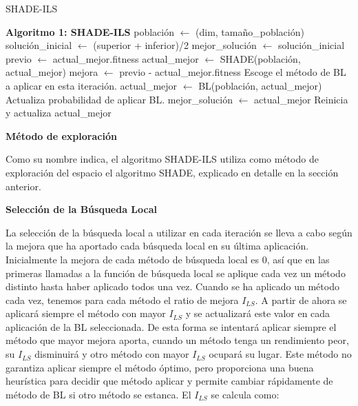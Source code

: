\begin{algorithm}
\caption{SHADE-ILS}
\begin{algorithmic}[1]
\STATE \textbf{Algoritmo 1: SHADE-ILS}
\STATE población $\leftarrow$ (dim, tamaño\_población)
\STATE solución\_inicial $\leftarrow$ (superior + inferior)/2
\STATE mejor\_solución $\leftarrow$ solución\_inicial
    \STATE previo $\leftarrow$ actual\_mejor.fitness
    \STATE actual\_mejor $\leftarrow$ SHADE(población, actual\_mejor)
    \STATE mejora $\leftarrow$ previo - actual\_mejor.fitness
    \STATE Escoge el método de BL a aplicar en esta iteración.
    \STATE actual\_mejor $\leftarrow$ BL(población, actual\_mejor)
    \STATE Actualiza probabilidad de aplicar BL.
        \STATE mejor\_solución $\leftarrow$ actual\_mejor
    \ENDIF
        \STATE Reinicia y actualiza actual\_mejor
    \ENDIF
\ENDWHILE
\end{algorithmic}
\end{algorithm}

\vspace{10px}

\noindent\textbf{Método de exploración}

Como su nombre indica, el algoritmo SHADE-ILS utiliza como método de exploración del espacio el algoritmo SHADE, explicado en detalle en la sección anterior.

\vspace{10px}

\noindent\textbf{Selección de la Búsqueda Local}

La selección de la búsqueda local a utilizar en cada iteración se lleva a cabo según la mejora que ha aportado cada búsqueda local en su última aplicación. Inicialmente la mejora de cada método de búsqueda local es $0$, así que en las primeras llamadas a la función de búsqueda local se aplique cada vez un método distinto hasta haber aplicado todos una vez. Cuando se ha aplicado un método cada vez, tenemos para cada método el ratio de mejora \( I_{LS} \). A partir de ahora se aplicará siempre el método con mayor \( I_{LS} \) y se actualizará este valor en cada aplicación de la BL seleccionada. De esta forma se intentará aplicar siempre el método que mayor mejora aporta, cuando un método tenga un rendimiento peor, su \( I_{LS} \) disminuirá y otro método con mayor \( I_{LS} \) ocupará su lugar. Este método no garantiza aplicar siempre el método óptimo, pero proporciona una buena heurística para decidir que método aplicar y permite cambiar rápidamente de método de BL si otro método se estanca. El \( I_{LS} \) se calcula como:

